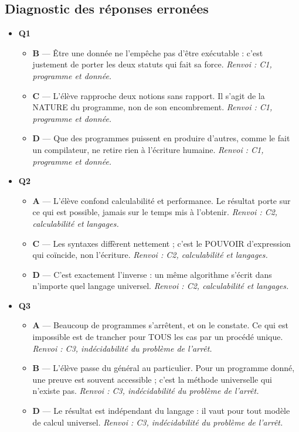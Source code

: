 \subsection*{Diagnostic des réponses erronées}

\begin{itemize}
  \item \textbf{Q1}
  \begin{itemize}
    \item \textbf{B} — Être une donnée ne l'empêche pas d'être exécutable : c'est justement de porter les deux statuts qui fait sa force. \emph{Renvoi : C1, programme et donnée.}
    \item \textbf{C} — L'élève rapproche deux notions sans rapport. Il s'agit de la NATURE du programme, non de son encombrement. \emph{Renvoi : C1, programme et donnée.}
    \item \textbf{D} — Que des programmes puissent en produire d'autres, comme le fait un compilateur, ne retire rien à l'écriture humaine. \emph{Renvoi : C1, programme et donnée.}
  \end{itemize}
  \item \textbf{Q2}
  \begin{itemize}
    \item \textbf{A} — L'élève confond calculabilité et performance. Le résultat porte sur ce qui est possible, jamais sur le temps mis à l'obtenir. \emph{Renvoi : C2, calculabilité et langages.}
    \item \textbf{C} — Les syntaxes diffèrent nettement ; c'est le POUVOIR d'expression qui coïncide, non l'écriture. \emph{Renvoi : C2, calculabilité et langages.}
    \item \textbf{D} — C'est exactement l'inverse : un même algorithme s'écrit dans n'importe quel langage universel. \emph{Renvoi : C2, calculabilité et langages.}
  \end{itemize}
  \item \textbf{Q3}
  \begin{itemize}
    \item \textbf{A} — Beaucoup de programmes s'arrêtent, et on le constate. Ce qui est impossible est de trancher pour TOUS les cas par un procédé unique. \emph{Renvoi : C3, indécidabilité du problème de l'arrêt.}
    \item \textbf{B} — L'élève passe du général au particulier. Pour un programme donné, une preuve est souvent accessible ; c'est la méthode universelle qui n'existe pas. \emph{Renvoi : C3, indécidabilité du problème de l'arrêt.}
    \item \textbf{D} — Le résultat est indépendant du langage : il vaut pour tout modèle de calcul universel. \emph{Renvoi : C3, indécidabilité du problème de l'arrêt.}

\end{itemize}
\end{itemize}
